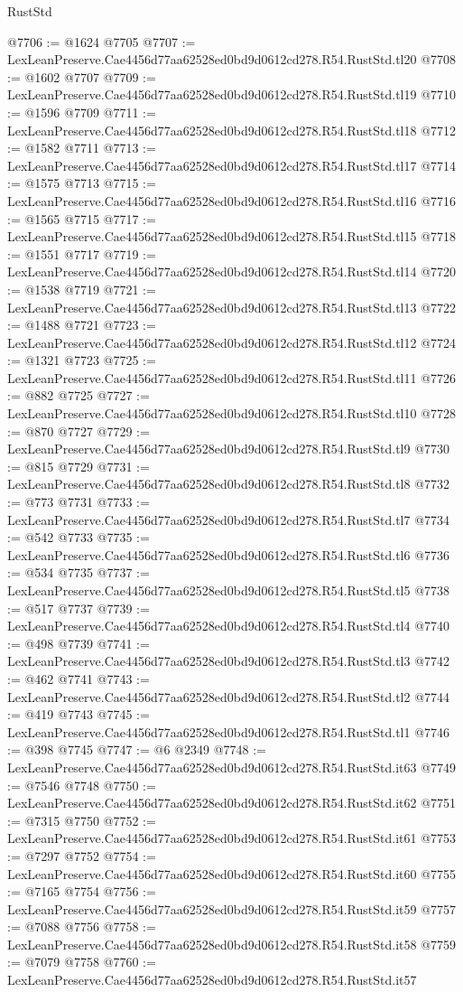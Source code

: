 \begin{lexlean}{RustStd}
\begin{coremodule}
@7706 := @1624 @7705
@7707 := LexLeanPreserve.Cae4456d77aa62528ed0bd9d0612cd278.R54.RustStd.tl20
@7708 := @1602 @7707
@7709 := LexLeanPreserve.Cae4456d77aa62528ed0bd9d0612cd278.R54.RustStd.tl19
@7710 := @1596 @7709
@7711 := LexLeanPreserve.Cae4456d77aa62528ed0bd9d0612cd278.R54.RustStd.tl18
@7712 := @1582 @7711
@7713 := LexLeanPreserve.Cae4456d77aa62528ed0bd9d0612cd278.R54.RustStd.tl17
@7714 := @1575 @7713
@7715 := LexLeanPreserve.Cae4456d77aa62528ed0bd9d0612cd278.R54.RustStd.tl16
@7716 := @1565 @7715
@7717 := LexLeanPreserve.Cae4456d77aa62528ed0bd9d0612cd278.R54.RustStd.tl15
@7718 := @1551 @7717
@7719 := LexLeanPreserve.Cae4456d77aa62528ed0bd9d0612cd278.R54.RustStd.tl14
@7720 := @1538 @7719
@7721 := LexLeanPreserve.Cae4456d77aa62528ed0bd9d0612cd278.R54.RustStd.tl13
@7722 := @1488 @7721
@7723 := LexLeanPreserve.Cae4456d77aa62528ed0bd9d0612cd278.R54.RustStd.tl12
@7724 := @1321 @7723
@7725 := LexLeanPreserve.Cae4456d77aa62528ed0bd9d0612cd278.R54.RustStd.tl11
@7726 := @882 @7725
@7727 := LexLeanPreserve.Cae4456d77aa62528ed0bd9d0612cd278.R54.RustStd.tl10
@7728 := @870 @7727
@7729 := LexLeanPreserve.Cae4456d77aa62528ed0bd9d0612cd278.R54.RustStd.tl9
@7730 := @815 @7729
@7731 := LexLeanPreserve.Cae4456d77aa62528ed0bd9d0612cd278.R54.RustStd.tl8
@7732 := @773 @7731
@7733 := LexLeanPreserve.Cae4456d77aa62528ed0bd9d0612cd278.R54.RustStd.tl7
@7734 := @542 @7733
@7735 := LexLeanPreserve.Cae4456d77aa62528ed0bd9d0612cd278.R54.RustStd.tl6
@7736 := @534 @7735
@7737 := LexLeanPreserve.Cae4456d77aa62528ed0bd9d0612cd278.R54.RustStd.tl5
@7738 := @517 @7737
@7739 := LexLeanPreserve.Cae4456d77aa62528ed0bd9d0612cd278.R54.RustStd.tl4
@7740 := @498 @7739
@7741 := LexLeanPreserve.Cae4456d77aa62528ed0bd9d0612cd278.R54.RustStd.tl3
@7742 := @462 @7741
@7743 := LexLeanPreserve.Cae4456d77aa62528ed0bd9d0612cd278.R54.RustStd.tl2
@7744 := @419 @7743
@7745 := LexLeanPreserve.Cae4456d77aa62528ed0bd9d0612cd278.R54.RustStd.tl1
@7746 := @398 @7745
@7747 := @6 @2349
@7748 := LexLeanPreserve.Cae4456d77aa62528ed0bd9d0612cd278.R54.RustStd.it63
@7749 := @7546 @7748
@7750 := LexLeanPreserve.Cae4456d77aa62528ed0bd9d0612cd278.R54.RustStd.it62
@7751 := @7315 @7750
@7752 := LexLeanPreserve.Cae4456d77aa62528ed0bd9d0612cd278.R54.RustStd.it61
@7753 := @7297 @7752
@7754 := LexLeanPreserve.Cae4456d77aa62528ed0bd9d0612cd278.R54.RustStd.it60
@7755 := @7165 @7754
@7756 := LexLeanPreserve.Cae4456d77aa62528ed0bd9d0612cd278.R54.RustStd.it59
@7757 := @7088 @7756
@7758 := LexLeanPreserve.Cae4456d77aa62528ed0bd9d0612cd278.R54.RustStd.it58
@7759 := @7079 @7758
@7760 := LexLeanPreserve.Cae4456d77aa62528ed0bd9d0612cd278.R54.RustStd.it57

\end{coremodule}
\end{lexlean}

